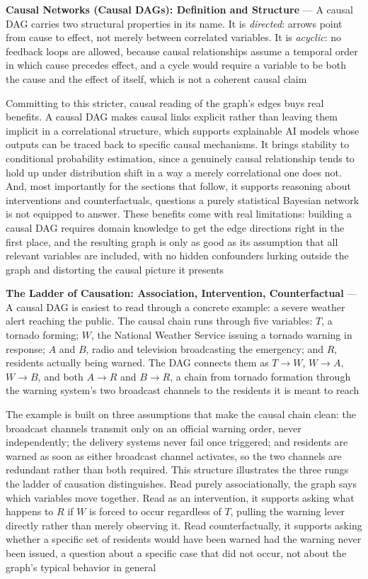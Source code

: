 \textbf{Causal Networks (Causal DAGs): Definition and Structure} --- A
causal DAG carries two structural properties in its name. It is
\emph{directed}: arrows point from cause to effect, not merely between
correlated variables. It is \emph{acyclic}: no feedback loops are allowed,
because causal relationships assume a temporal order in which cause
precedes effect, and a cycle would require a variable to be both the cause
and the effect of itself, which is not a coherent causal claim

Committing to this stricter, causal reading of the graph's edges buys real
benefits. A causal DAG makes causal links explicit rather than leaving them
implicit in a correlational structure, which supports explainable AI models
whose outputs can be traced back to specific causal mechanisms. It brings
stability to conditional probability estimation, since a genuinely causal
relationship tends to hold up under distribution shift in a way a merely
correlational one does not. And, most importantly for the sections that
follow, it supports reasoning about interventions and counterfactuals,
questions a purely statistical Bayesian network is not equipped to answer.
These benefits come with real limitations: building a causal DAG requires
domain knowledge to get the edge directions right in the first place, and
the resulting graph is only as good as its assumption that all relevant
variables are included, with no hidden confounders lurking outside the
graph and distorting the causal picture it presents

\textbf{The Ladder of Causation: Association, Intervention, Counterfactual}
--- A causal DAG is easiest to read through a concrete example: a severe
weather alert reaching the public. The causal chain runs through five
variables: $T$, a tornado forming; $W$, the National Weather Service
issuing a tornado warning in response; $A$ and $B$, radio and television
broadcasting the emergency; and $R$, residents actually being warned. The
DAG connects them as $T \to W$, $W \to A$, $W \to B$, and both $A \to R$ and
$B \to R$, a chain from tornado formation through the warning system's two
broadcast channels to the residents it is meant to reach

The example is built on three assumptions that make the causal chain
clean: the broadcast channels transmit only on an official warning order,
never independently; the delivery systems never fail once triggered; and
residents are warned as soon as either broadcast channel activates, so the
two channels are redundant rather than both required. This structure
illustrates the three rungs the ladder of causation distinguishes. Read
purely associationally, the graph says which variables move together.
Read as an intervention, it supports asking what happens to $R$ if $W$ is
forced to occur regardless of $T$, pulling the warning lever directly
rather than merely observing it. Read counterfactually, it supports asking
whether a specific set of residents would have been warned had the warning
never been issued, a question about a specific case that did not occur,
not about the graph's typical behavior in general

